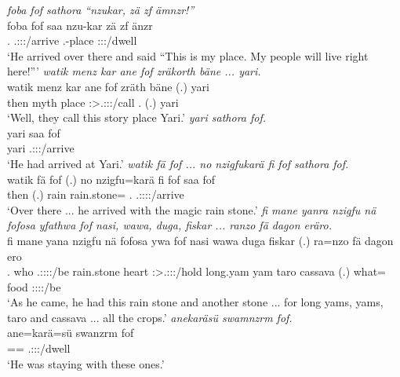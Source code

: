 \begin{exe}
	\emph{foba fof sathora ``nzukar, zä zf ämnzr!''}\\
	\gll foba fof saa nzu-kar zä zf änzr\\ 
	\Dist.{\Abl} {\Emph} \Tsg.\Masc:\Sbj:\Pst:\Pfv/arrive \Fsg.\Poss-place {\Prox} {\Imm} \Stpl:\Sbj:\Nonpast:\Ipfv/dwell\\
	\trans `He arrived over there and said ``This is my place. My people will live right here!'''
	\emph{watik menz kar ane fof zräkorth bäne ... yari.}\\
	\gll watik menz kar ane fof zräth bäne (.) yari\\ 
	then myth place {\Dem} {\Emph} \Stpl:\Sbj>\Tsg.\F:\Obj:\Irr:\Pfv/call \Recog.{\Abs} (.) yari\\
	\trans `Well, they call this story place Yari.'
	\emph{yari sathora fof.}\\
	\gll yari saa fof\\ 
	yari \Tsg.\Masc:\Sbj:\Pst:\Pfv/arrive {\Emph}\\
	\trans `He had arrived at Yari.'
\newpage 
{} 
	\emph{watik fä fof ... no nzigfukarä fi fof sathora fof.}\\
	\gll watik fä fof (.) no nzigfu=karä fi fof saa fof\\ 
	then {\Dist} {\Emph} (.) rain rain.stone={\Prop} \Third.{\Abs} {\Emph} \Tsg.\Masc:\Sbj:\Pst:\Pfv:\Venit/arrive {\Emph}\\
	\trans `Over there ... he arrived with the magic rain stone.'
	\emph{fi mane yanra nzigfu nä fofosa yfathwa fof nasi, wawa, duga, fiskar ... ranzo fä dagon eräro.}\\
	\gll fi mane yana nzigfu nä fofosa ywa fof nasi wawa duga fiskar (.) ra=nzo fä dagon ero\\ 
	\Third.{\Abs} who \Tsg.\Masc:\Sbj:\Pst:\Ipfv:\Venit/be rain.stone {\Indf} heart \Sg:\Sbj>\Tsg.\Masc:\Obj:\Pst:\Ipfv/hold {\Emph} long.yam yam taro cassava (.) what={\Only} {\Dist} food \Stpl:\Sbj:\Nonpast:\Ipfv:\Andat/be\\
	\trans `As he came, he had this rain stone and another stone ... for long yams, yams, taro and cassava ... all the crops.'
	\emph{anekaräsü swamnzrm fof.}\\
	\gll ane=karä=sü swanzrm fof\\ 
	\Dem=\Prop=\Etc{} \Tsg.\Masc:\Sbj:\Pst:\Dur/dwell {\Emph}\\
	\trans `He was staying with these ones.'

\end{exe}
